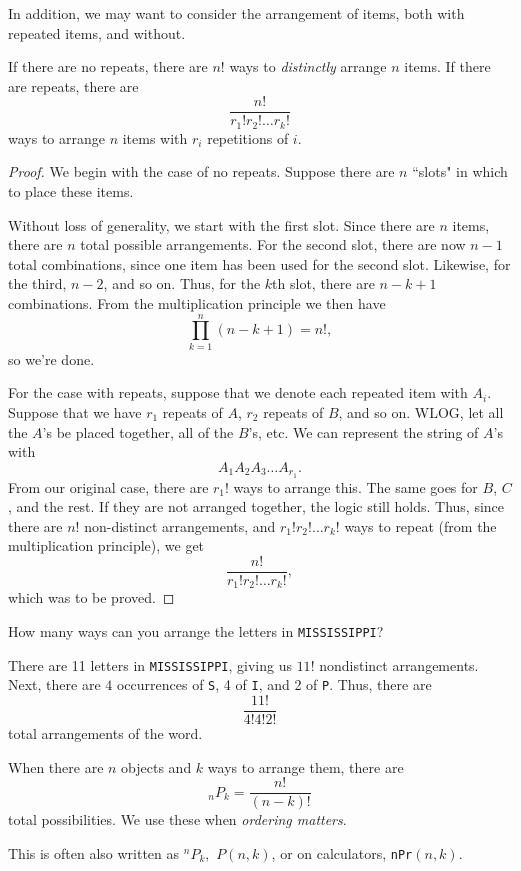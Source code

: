\documentclass[11pt]{article}
\begin{document}
In addition, we may want to consider the arrangement of items, both with repeated items, and without.

\begin{thrm}
    If there are no repeats, there are $n!$ ways to \textit{distinctly} arrange $n$ items. If there are repeats, there are
    \[\frac{n!}{r_1!r_2!\dots r_k!}\]
    ways to arrange $n$ items with $r_i$ repetitions of $i$.
\end{thrm}
\begin{proof}
    We begin with the case of no repeats. Suppose there are $n$ ``slots" in which to place these items.
    
    Without loss of generality, we start with the first slot. Since there are $n$ items, there are $n$ total possible arrangements. For the second slot, there are now $n-1$ total combinations, since one item has been used for the second slot. Likewise, for the third, $n-2$, and so on. Thus, for the $k$th slot, there are $n-k+1$ combinations. From the multiplication principle we then have
    \[\prod_{k=1}^{n} (n-k+1) = n!,\]
    so we're done.
    
    For the case with repeats, suppose that we denote each repeated item with $A_i$. Suppose that we have $r_1$ repeats of $A$, $r_2$ repeats of $B$, and so on. WLOG, let all the $A$'s be placed together, all of the $B$'s, etc. We can represent the string of $A$'s with
    \[A_1A_2A_3\dots A_{r_1}.\]
    From our original case, there are $r_1!$ ways to arrange this. The same goes for $B$, $C$, and the rest. If they are not arranged together, the logic still holds. Thus, since there are $n!$ non-distinct arrangements, and $r_1!r_2!\dots r_k!$ ways to repeat (from the multiplication principle), we get
    \[\frac{n!}{r_1!r_2!\dots r_k!},\]
    which was to be proved.
\end{proof}

\begin{example}
    How many ways can you arrange the letters in \texttt{MISSISSIPPI}?
\end{example}
\begin{solution}
    There are 11 letters in \texttt{MISSISSIPPI}, giving us $11!$ nondistinct arrangements. Next, there are $4$ occurrences of \texttt{S}, 4 of \texttt{I}, and 2 of \texttt{P}. Thus, there are 
    \[\frac{11!}{4!4!2!}\]
    total arrangements of the word.
\end{solution}

\begin{defn}[Permutations]
    When there are $n$ objects and $k$ ways to arrange them, there are
    \[_nP_k = \frac{n!}{(n-k)!}\]
    total possibilities. We use these when \textit{ordering matters}.
\end{defn}
\begin{remark}
    This is often also written as $^nP_k,$ $P(n,k)$, or on calculators, \texttt{nPr}$(n,k)$.
\end{remark}
\end{document}
